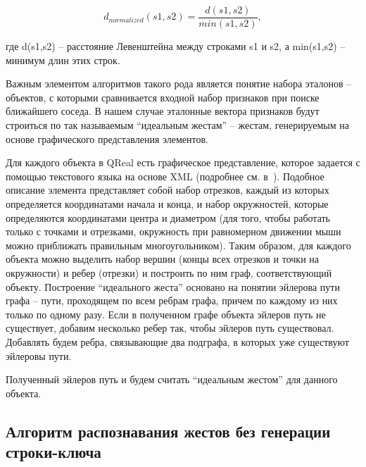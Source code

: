 \documentclass[a5paper]{article}
\begin{document}
\begin{equation}
\label{levenshtein}
d_{normalized}(s1,s2) = \frac{d(s1,s2)}{min(s1,s2)},
\end{equation}

где d(s1,s2) -- расстояние Левенштейна между строками s1 и s2, а min(s1,s2) -- минимум длин этих строк.

Важным элементом алгоритмов такого рода является понятие набора эталонов -- объектов, с которыми сравнивается входной набор признаков при 
поиске ближайшего соседа. В нашем случае эталонные вектора признаков будут строиться по так называемым ``идеальным жестам'' -- жестам,
генерируемым на основе графического представления элементов. 

Для каждого объекта в QReal есть графическое представление, которое задается с помощью текстового языка на основе XML (подробнее см. в~\cite{qrealBasic}). 
Подобное описание элемента представляет собой набор отрезков, каждый из которых определяется координатами начала и конца, и
набор окружностей, которые определяются координатами центра и диаметром (для того, чтобы работать только с точками и отрезками, 
окружность при равномерном движении мыши можно приближать правильным многоугольником). 
Таким образом, для каждого объекта можно выделить набор вершин (концы всех отрезков и точки на окружности) и ребер (отрезки) и 
построить по ним граф, соответствующий объекту. Построение ``идеального жеста'' основано на понятии эйлерова пути графа --  
пути, проходящем по всем ребрам графа, причем по каждому из них только по одному разу. 
Если в полученном графе объекта эйлеров путь не существует, добавим несколько ребер так, чтобы эйлеров путь существовал. 
Добавлять будем ребра, связывающие два подграфа, в которых уже существуют эйлеровы пути.

Полученный эйлеров путь и будем считать ``идеальным жестом'' для данного объекта. 


\subsection{Алгоритм распознавания жестов без генерации строки-ключа}
\end{document}
